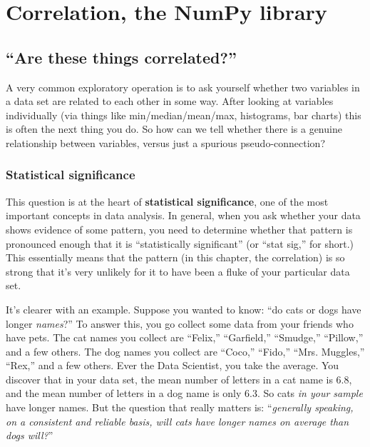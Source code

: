 
\chapter{Correlation, the NumPy library}
\label{ch:correlation}

\section{``Are these things correlated?''}

A very common exploratory operation is to ask yourself whether two variables
in a data set are related to each other in some way. After looking at
variables individually (via things like min/median/mean/max, histograms, bar
charts) this is often the next thing you do. So how can we tell whether there
is a genuine relationship between variables, versus just a spurious
pseudo-connection?

\subsection{Statistical significance}

This question is at the heart of \textbf{statistical significance}, one of the
most important concepts in data analysis. In general, when you ask whether your
data shows evidence of some pattern, you need to determine whether that pattern
is pronounced enough that it is ``statistically significant'' (or ``stat sig,''
for short.) This essentially means that the pattern (in this chapter,
the correlation) is so strong that it's very unlikely for it to have been a
fluke of your particular data set.

It's clearer with an example. Suppose you wanted to know: ``do cats or dogs
have longer \textit{names}?'' To answer this, you go collect some data from
your friends who have pets. The cat names you collect are ``\textsf{Felix},''
``\textsf{Garfield},'' ``\textsf{Smudge},'' ``\textsf{Pillow},'' and a few
others. The dog names you collect are ``\textsf{Coco},'' ``\textsf{Fido},''
``\textsf{Mrs. Muggles},'' ``\textsf{Rex},'' and a few others. Ever the Data
Scientist, you take the average. You discover that in your data set, the mean
number of letters in a cat name is 6.8, and the mean number of letters in a dog
name is only 6.3. So cats \textit{in your sample} have longer names. But the
question that really matters is: ``\textit{generally speaking, on a consistent
and reliable basis, will cats have longer names on average than dogs will?}''

